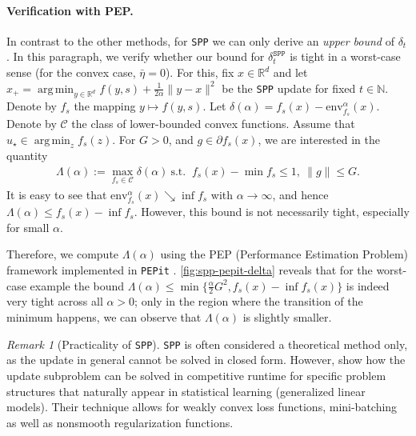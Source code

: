 \documentclass{article}
\DeclareMathOperator*{\argmin}{arg\,min}
\newcommand{\env}[1]{\mathrm{env}_{#1}}
\newcommand{\R}{\mathbb{R}}
\newcommand{\N}{\mathbb{N}}
\newcommand{\SPP}{{\texttt{SPP}}}
\theoremstyle{plain}
\theoremstyle{definition}
\theoremstyle{remark}
\newtheorem{remark}[theorem]{Remark}
\begin{document}
\paragraph{Verification with PEP.} In contrast to the other methods, for \SPP{} we can only derive an \emph{upper bound} of $\delta_t$. In this paragraph, we verify whether our bound for $\delta_t^{\SPP{}}$ is tight in a worst-case sense (for the convex case, $\bar{\eta}=0$). For this, fix $x \in \R^d$ and let $x_+ = \argmin_{y\in \R^d} f(y,s) + \frac{1}{2\alpha}\|y-x\|^2$ be the \SPP{} update for fixed $t\in \N$.
Denote by $f_s$ the mapping $y \mapsto f(y,s)$.
Let $\delta(\alpha) = f_s(x) - \env{f_s}^\alpha(x)$. Denote by $\mathcal{C}$ the class of lower-bounded convex functions. Assume that $u_\star \in \argmin_z f_s(z)$. For $G> 0$, and $g\in \partial f_s(x)$, we are interested in the quantity
\begin{align*}
    \Lambda(\alpha) := \max_{f_s \in \mathcal{C}} \delta(\alpha) ~ \text{s.t.\ }~ f_s(x) - \min f_s \leq 1,~ \|g\| \leq G.
\end{align*}
It is easy to see that $\env{f_s}^\alpha(x) \searrow \inf f_s$ with $\alpha\to \infty$, and hence $\Lambda(\alpha)\leq f_s(x) - \inf f_s$. However, this bound is not necessarily tight, especially for small $\alpha$.

Therefore, we compute $\Lambda(\alpha)$ using the PEP (Performance Estimation Problem) framework \citep{Drori2014,Taylor2017} implemented in \texttt{PEPit} \citep{Goujaud2024}.
\cref{fig:spp-pepit-delta} reveals that for the worst-case example the bound
    $\Lambda(\alpha) \leq \min\{\frac{\alpha}{2} G^2, f_s(x) - \inf f_s(x)\}$
is indeed very tight across all $\alpha > 0$; only in the region where the transition of the minimum happens, we can observe that $\Lambda(\alpha)$ is slightly smaller.
%
\begin{remark}[Practicality of \SPP{}]
    \SPP{} is often considered a theoretical method only, as the update in general cannot be solved in closed form. However, \citet{Milzarek2024} show how the update subproblem can be solved in competitive runtime for specific problem structures that naturally appear in statistical learning (generalized linear models). Their technique allows for weakly convex loss functions, mini-batching as well as nonsmooth regularization functions.
\end{remark}
%
\end{document}
